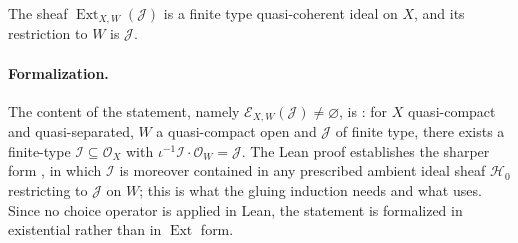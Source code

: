 \begin{lemma}
  \label{lemma:nagata-extend-finite-type-ideal}

  The sheaf $\operatorname{Ext}_{X,W}(\mathcal J)$ is a finite type
  quasi-coherent ideal on $X$, and its restriction to $W$ is
  $\mathcal J$.

  \paragraph{Formalization.}
  The content of the statement, namely
  $\mathscr E_{X,W}(\mathcal J)\neq\varnothing$, is
  \texttt{}: for $X$
  quasi-compact and quasi-separated, $W$ a quasi-compact open and
  $\mathcal J$ of finite type, there exists a finite-type
  $\mathcal I\subseteq\mathcal O_X$ with
  $\iota^{-1}\mathcal I\cdot\mathcal O_W=\mathcal J$.  The Lean proof establishes the
  sharper form \texttt{},
  in which $\mathcal I$ is moreover contained in any prescribed ambient ideal sheaf
  $\mathcal H_0$ restricting to $\mathcal J$ on $W$; this is what the gluing induction
  needs and what  uses.  Since no choice
  operator is applied in Lean, the statement is formalized in existential rather than in
  $\operatorname{Ext}$ form.
\end{lemma}

